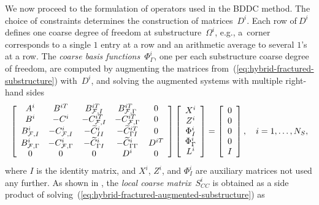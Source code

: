We now proceed to the formulation of
operators used in the BDDC method. The choice of constraints determines the
construction of matrices~$D^{i}$. Each row of$~D^{i}$ defines one coarse
degree of freedom at substructure~$\Omega^{i}$, e.g., a~corner
corresponds to a single $1$ entry at a row and an arithmetic average to
several $1$'s at a row. The \emph{coarse basis functions}~$\Phi_{\Gamma}^{i}$,
one per each substructure coarse degree of freedom, are computed by augmenting
the matrices from~(\ref{eq:hybrid-fractured-substructure}) with~$D^{i}$, and
solving the augmented systems with multiple right-hand sides 
\begin{equation}
\left[
\begin{array}
[c]{ccccc}%
A^{i} & B^{iT} & B_{\mathcal{F},I}^{iT} & B_{\mathcal{F},\Gamma}^{iT} & 0\\
B^{i} & -C^{i} & -C_{\mathcal{F},I}^{iT} & -C_{\mathcal{F},\Gamma
}^{iT} & 0\\
B_{\mathcal{F},I}^{i} & -C_{\mathcal{F},I}^{i} & -\widetilde{C}_{II}^{i} &
-\widetilde{C}_{{\Gamma}I}^{iT} & 0\\
B_{\mathcal{F},\Gamma}^{i} & -C_{\mathcal{F},\Gamma}^{i} & -\widetilde{C}%
_{{\Gamma}I}^{i} & -\widetilde{C}_{{\Gamma}{\Gamma}}^{i} & D^{iT}\\
0 & 0 & 0 & D^{i} & 0
\end{array}
\right]  \left[
\begin{array}
[c]{c}%
X^{i}\\
Z^{i}\\
\Phi_{I}^{i}\\
\Phi_{\Gamma}^{i}\\
L^{i}%
\end{array}
\right]  =\left[
\begin{array}
[c]{c}%
0\\
0\\
0\\
0\\
I
\end{array}
\right]  ,\quad i=1,\dots,N_{S},
\label{eq:hybrid-fractured-augmented-substructure}%
\end{equation}
where $I$ is the identity matrix, and $X^{i}$, $Z^{i}$, and $\Phi_{I}^{i}$ are
auxiliary matrices not used any further. 
As shown in \cite{Pultarova-2012-PCP},
the \emph{local coarse matrix}~$S_{CC}^{i}$ is obtained 
as a side product of solving~(\ref{eq:hybrid-fractured-augmented-substructure}) 
as
